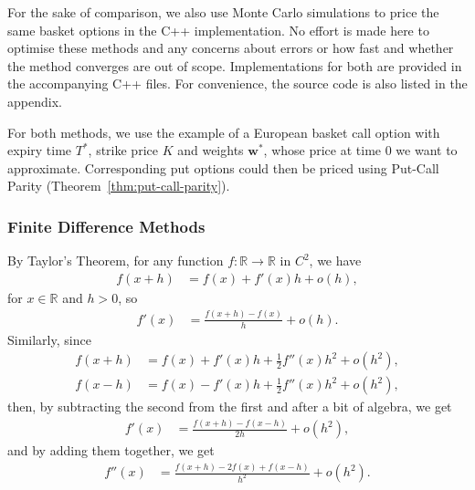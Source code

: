 \documentclass[english]{article}
\numberwithin{equation}{section}
\numberwithin{figure}{section}
\theoremstyle{bolddescit}
\theoremstyle{definition}
\theoremstyle{definition}
\theoremstyle{plain}
\theoremstyle{plain}
\theoremstyle{bolddesc}
\theoremstyle{plain}
\theoremstyle{remark}
\begin{document}
For the sake of comparison, we also use Monte Carlo simulations to price the same basket options in the C++ implementation. No effort is made here to optimise these methods and any concerns about errors or how fast and whether the method converges are out of scope. Implementations for both are provided in the accompanying C++ files. For convenience, the source code is also listed in the appendix.

For both methods, we use the example of a European basket call option with expiry time $T^*$, strike price $K$ and weights $\mathbf{w}^*$, whose price at time 0 we want to approximate. Corresponding put options could then be priced using Put-Call Parity (Theorem~\ref{thm:put-call-parity}).

\subsubsection{Finite Difference Methods}

By Taylor's Theorem, for any function $f : \mathbb{R} \to \mathbb{R}$ in $C^2$, we have
\begin{align*}
  f(x+h) &= f(x) + f'(x) h + o(h),
\end{align*}
for $x \in \mathbb{R}$ and $h > 0$, so
\begin{align*}
  f'(x) &= \frac{f(x+h) - f(x)}{h} + o(h).
\end{align*}
Similarly, since
\begin{align*}
  f(x+h) &= f(x) + f'(x) h + \frac{1}{2} f''(x) h^2 + o(h^2),\\
  f(x-h) &= f(x) - f'(x) h + \frac{1}{2} f''(x) h^2 + o(h^2),
\end{align*}
then, by subtracting the second from the first and after a bit of algebra, we get
\begin{align*}
  f'(x) &= \frac{f(x+h) - f(x-h)}{2h} + o(h^2),
\end{align*}
and by adding them together, we get
\begin{align*}
  f''(x) &= \frac{f(x+h) - 2f(x) + f(x-h)}{h^2} + o(h^2).
\end{align*}
\end{document}
